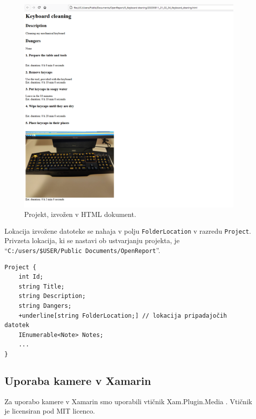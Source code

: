 \documentclass[a4paper, 12pt]{book}
\begin{document}
\begin{figure}[H]
\begin{center}
\includegraphics[width=13cm]{export_html}
\end{center}
\caption{Projekt, izvožen v HTML dokument.}
\label{export_html}
\end{figure}

Lokacija izvožene datoteke se nahaja v polju \texttt{FolderLocation} v razredu \texttt{Project}.
Privzeta lokacija, ki se nastavi ob ustvarjanju projekta, je 
\\\enquote{\texttt{C:/users/\$USER/Public Documents/OpenReport}}.

\begin{Verbatim}[commandchars=+\[\]]
Project {
    int Id; 
    string Title; 
    string Description; 
    string Dangers; 
    +underline[string FolderLocation;] // lokacija pripadajočih datotek 
    IEnumerable<Note> Notes; 
    ... 
}
\end{Verbatim}






\subsection{Uporaba kamere v Xamarin}

Za uporabo kamere v Xamarin smo uporabili vtičnik Xam.Plugin.Media \cite{xampluginmedia}.
Vtičnik je licensiran pod MIT licenco.
\end{document}
